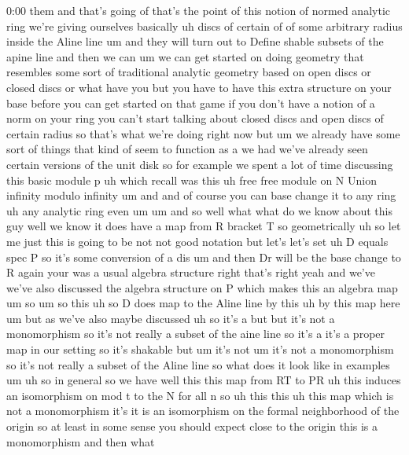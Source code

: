 \begin{unfinished}{0:00}
them  and  that's  going  of  that's  the
point  of  this  notion  of  normed  analytic
ring  we're  giving  ourselves  basically  uh
discs  of  certain  of  of  some  arbitrary
radius  inside  the  Aline  line  um  and  they
will  turn  out  to  Define  shable  subsets
of  the  apine  line  and  then  we  can  um  we
can  get  started  on  doing  geometry  that
resembles  some  sort  of  traditional
analytic  geometry  based  on  open  discs  or
closed  discs  or  what  have  you  but  you
have  to  have  this  extra  structure  on
your  base  before  you  can  get  started  on
that  game  if  you  don't  have  a  notion  of
a  norm  on  your  ring  you  can't  start
talking  about  closed  discs  and  open
discs  of  certain  radius  so  that's  what
we're  doing  right  now  but  um  we  already
have  some  sort  of  things  that  kind  of
seem  to  function  as
a  we  had  we've  already  seen  certain
versions  of  the  unit  disk  so  for  example
we  spent  a  lot  of  time  discussing  this
basic  module
p  uh  which  recall  was  this  uh  free  free
module  on  N  Union  infinity  modulo
infinity  um  and  and  of  course  you  can
base  change  it  to  any
ring  uh  any  analytic  ring  even
um  um  and  so  well  what  what  do  we  know
about  this  guy  well  we  know  it  does  have
a  map  from  R  bracket
T  so
geometrically  uh  so  let  me  just  this  is
going  to  be  not  not  good  notation  but
let's  let's  set  uh  D  equals  spec
P  so  it's  some  conversion  of  a  dis  um
and  then  Dr  will  be  the  base  change  to
R  again  your  was  a  usual  algebra
structure  right  that's  right  yeah  and
we've  we've  also  discussed  the  algebra
structure  on  P  which  makes  this  an
algebra
map
um  so  um  so  this  uh  so  D  does  map  to  the
Aline  line  by  this  uh  by  this  map  here
um  but  as  we've  also  maybe  discussed  uh
so  it's  a  but  but  it's  not  a
monomorphism  so  it's  not  really  a  subset
of  the  aine  line  so  it's  a  it's  a  proper
map  in  our  setting  so  it's  shakable  but
um  it's  not  um  it's  not  a  monomorphism
so  it's  not  really  a  subset  of  the  Aline
line  so  what  does  it  look  like  in
examples
um  uh
so  in  general
so  we  have  well  this  this  map  from  RT  to
PR  uh  this  induces  an
isomorphism  on  mod  t  to  the  N  for  all
n  so  uh  this  this  uh  this  map  which  is
not  a  monomorphism  it's  it  is  an
isomorphism  on  the  formal  neighborhood
of  the  origin  so  at  least  in  some  sense
you  should  expect  close  to  the  origin
this  is  a  monomorphism  and  then  what

\end{unfinished}
